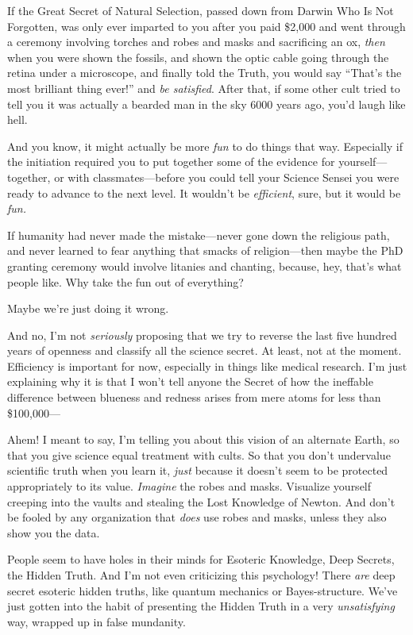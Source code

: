 {
 If the Great Secret of Natural Selection, passed down from Darwin
Who Is Not Forgotten, was only ever imparted to you after you paid
\$2,000 and went through a ceremony involving torches and robes and
masks and sacrificing an ox, \textit{then} when you were shown the
fossils, and shown the optic cable going through the retina under a
microscope, and finally told the Truth, you would say
``That's the most brilliant thing
ever!'' and \textit{be satisfied}. After that, if
some other cult tried to tell you it was actually a bearded man in the
sky 6000 years ago, you'd laugh like hell.}

{
 And you know, it might actually be more \textit{fun} to do things
that way. Especially if the initiation required you to put together
some of the evidence for yourself---together, or with
classmates---before you could tell your Science Sensei you were ready
to advance to the next level. It wouldn't be
\textit{efficient}, sure, but it would be \textit{fun.}}

{
 If humanity had never made the mistake---never gone down the
religious path, and never learned to fear anything that smacks of
religion---then maybe the PhD granting ceremony would involve litanies
and chanting, because, hey, that's what people like.
Why take the fun out of everything?}

{
 Maybe we're just doing it wrong.}

{
 And no, I'm not \textit{seriously} proposing that
we try to reverse the last five hundred years of openness and classify
all the science secret. At least, not at the moment. Efficiency is
important for now, especially in things like medical research.
I'm just explaining why it is that I
won't tell anyone the Secret of how the ineffable
difference between blueness and redness arises from mere atoms for less
than \$100,000---}

{
 Ahem! I meant to say, I'm telling you about this
vision of an alternate Earth, so that you give science equal treatment
with cults. So that you don't undervalue scientific
truth when you learn it, \textit{just} because it
doesn't seem to be protected appropriately to its
value. \textit{Imagine} the robes and masks. Visualize yourself
creeping into the vaults and stealing the Lost Knowledge of Newton. And
don't be fooled by any organization that \textit{does}
use robes and masks, unless they also show you the data.}

{
 People seem to have holes in their minds for Esoteric Knowledge,
Deep Secrets, the Hidden Truth. And I'm not even
criticizing this psychology! There \textit{are} deep secret esoteric
hidden truths, like quantum mechanics or Bayes-structure.
We've just gotten into the habit of presenting the
Hidden Truth in a very \textit{unsatisfying} way, wrapped up in false
mundanity.}

